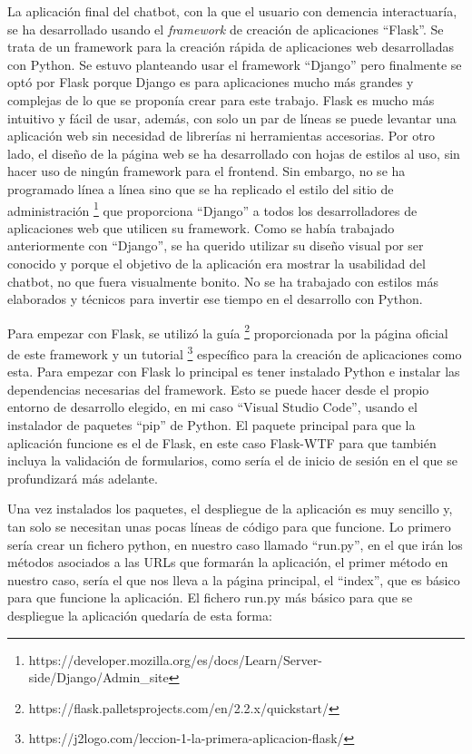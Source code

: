 La aplicación final del chatbot, con la que el usuario con demencia interactuaría, se ha desarrollado usando el \textit{framework} de creación de aplicaciones ``Flask''. Se trata de un framework para la creación rápida de aplicaciones web desarrolladas con Python. Se estuvo planteando usar el framework ``Django'' pero finalmente se optó por Flask porque Django es para aplicaciones mucho más grandes y complejas de lo que se proponía crear para este trabajo. Flask es mucho más intuitivo y fácil de usar, además, con solo un par de líneas se puede levantar una aplicación web sin necesidad de librerías ni herramientas accesorias. Por otro lado, el diseño de la página web se ha desarrollado con hojas de estilos al uso, sin hacer uso de ningún framework para el frontend. Sin embargo, no se ha programado línea a línea sino que se ha replicado el estilo del sitio de administración \footnote{https://developer.mozilla.org/es/docs/Learn/Server-side/Django/Admin\_site} que proporciona ``Django'' a todos los desarrolladores de aplicaciones web que utilicen su framework. Como se había trabajado anteriormente con ``Django'', se ha querido utilizar su diseño visual por ser conocido y porque el objetivo de la aplicación era mostrar la usabilidad del chatbot, no que fuera visualmente bonito. No se ha trabajado con estilos más elaborados y técnicos para invertir ese tiempo en el desarrollo con Python.

Para empezar con Flask, se utilizó la guía \footnote{https://flask.palletsprojects.com/en/2.2.x/quickstart/} proporcionada por la página oficial de este framework y un tutorial \footnote{https://j2logo.com/leccion-1-la-primera-aplicacion-flask/} específico para la creación de aplicaciones como esta. Para empezar con Flask lo principal es tener instalado Python e instalar las dependencias necesarias del framework. Esto se puede hacer desde el propio entorno de desarrollo elegido, en mi caso ``Visual Studio Code'', usando el instalador de paquetes ``pip'' de Python. El paquete principal para que la aplicación funcione es el de Flask, en este caso Flask-WTF para que también incluya la validación de formularios, como sería el de inicio de sesión en el que se profundizará más adelante.  

Una vez instalados los paquetes, el despliegue de la aplicación es muy sencillo y, tan solo se necesitan unas pocas líneas de código para que funcione. Lo primero sería crear un fichero python, en nuestro caso llamado ``run.py'', en el que irán los métodos asociados a las URLs que formarán la aplicación, el primer método en nuestro caso, sería el que nos lleva a la página principal, el ``index'', que es básico para que funcione la aplicación. El fichero run.py más básico para que se despliegue la aplicación quedaría de esta forma:

